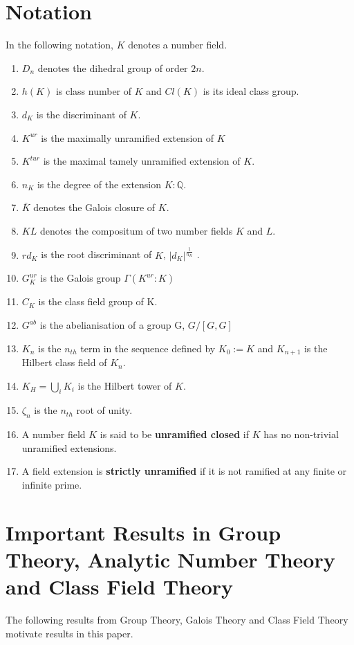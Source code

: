 \documentclass[12pt]{extarticle}
\newcommand{\Q}{\mathbb{Q}}
\newcommand{\<}{\langle}
\renewcommand{\>}{\rangle}
\theoremstyle{definition}
\begin{document}
\section{Notation}
In the following notation, $K$ denotes a number field.
\begin{enumerate}
    \item $D_n$ denotes the dihedral group of order $2n$. 
    \item $h(K)$ is class number of $K$ and $Cl(K)$ is its ideal class group.
    \item $d_K$ is the discriminant of $K$.
    \item $K^{ur}$ is the maximally unramified extension of $K$
    \item $K^{tur}$ is the maximal tamely unramified extension of $K$.
    \item $n_K$ is the degree of the extension $K:\Q$.
    \item $\bar{K}$ denotes the Galois closure of $K$.
    \item $KL$ denotes the compositum of two number fields $K$ and $L$.
    \item $rd_K$ is the root discriminant of $K$, $|d_K|^\frac{1}{n_K}$ .
    \item $G_K^{ur}$ is the Galois group $\Gamma(K^{ur}:K)$
    \item $C_K$ is the class field group of K. 
    \item $G^{ab}$ is the abelianisation of a group G, $G/[G,G]$
    \item $K_n$ is the $n_{th}$ term in the sequence defined by $K_0:=K$ and $K_{n+1}$ is the Hilbert class field of $K_n$.
    \item $K_H=\bigcup_{i}K_{i}$ is the Hilbert tower of $K$.  
    \item $\zeta_n$ is the $n_{th}$ root of unity. 
    \item A number field $K$ is said to be \textbf{unramified closed} if $K$ has no non-trivial unramified extensions. 
    \item A field extension is \textbf{strictly unramified} if it is not ramified at any finite or infinite prime.
\end{enumerate}

\section{Important Results in Group Theory, Analytic Number Theory and Class Field Theory}

The following results from Group Theory, Galois Theory and Class Field Theory motivate results in this paper.  
\end{document}
